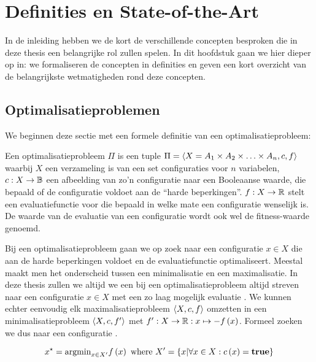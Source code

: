 \chapter{Definities en State-of-the-Art}
\label{hoofdstuk:1}

In de inleiding hebben we de kort de verschillende concepten besproken die in deze thesis een belangrijke rol zullen spelen. In dit hoofdstuk gaan we hier dieper op in: we formaliseren de concepten in definities en geven een kort overzicht van de belangrijkste wetmatigheden rond deze concepten.

\section{Optimalisatieproblemen}

We beginnen deze sectie met een formele definitie van een optimalisatieprobleem:

\begin{definition}[Optimalisatieprobleem]%
Een optimalisatieprobleem $\Pi$ is een tuple $\Pi=\left\langle X=A_1\times A_2\times\ldots\times A_n,c,f\right\rangle$ waarbij $X$ een verzameling is van een set configuraties voor $n$ variabelen, $c:X\rightarrow\mathbb{B}$ een afbeelding van zo'n configuratie naar een Booleaanse waarde, die bepaald of de configuratie voldoet aan de ``harde beperkingen''. $f:X\rightarrow\mathbb{R}$ stelt een evaluatiefunctie voor die bepaald in welke mate een configuratie wenselijk is. De waarde van de evaluatie van een configuratie  wordt ook wel de fitness-waarde genoemd.
\end{definition}
Bij een optimalisatieprobleem gaan we op zoek naar een configuratie $x\in X$ die aan de harde beperkingen voldoet en de evaluatiefunctie optimaliseert. Meestal maakt men het onderscheid tussen een minimalisatie en een maximalisatie. In deze thesis zullen we altijd we een bij een optimalisatieprobleem altijd streven naar een configuratie $x\in X$ met een zo laag mogelijk evaluatie . We kunnen echter eenvoudig elk maximalisatieprobleem $\left\langle X,c,f\right\rangle$ omzetten in een minimalisatieprobleem $\left\langle X,c,f'\right\rangle$ met $f':X\rightarrow\mathbb{R}:x\mapsto-f\left(x\right)$. Formeel zoeken we dus naar een configuratie \xstar{}.

\begin{equation}
x^{\star}=\displaystyle\mbox{argmin}_{x\in X'}f\left(x\right)\mbox{ where }X'=\left\{ x|\forall x\in X:c\left(x\right)=\mbox{\textbf{true}}\right\}
\end{equation}

